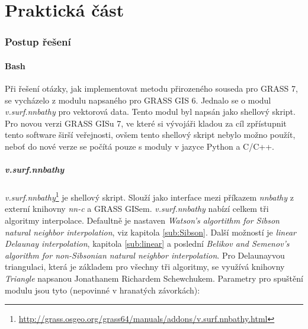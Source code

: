 \documentclass[12pt,a4paper]{article}
\begin{document}
\newpage	
\part{Praktická část}

\newpage
\section{Postup řešení}
\subsection{Bash}
\label{sub:Bash}

Při řešení otázky, jak implementovat metodu přirozeného souseda pro
GRASS 7, se vycházelo z modulu napsaného pro GRASS GIS 6. Jednalo se o
modul \emph{v.surf.nnbathy} pro vektorová data. Tento modul byl napsán
jako shellový skript. Pro novou verzi GRASS GISu 7, ve které si vývojáři kladou za
cíl zpřístupnit tento software širší veřejnosti, ovšem tento shellový skript nebylo možno použít, neboť do nové verze se počítá pouze s
moduly v jazyce Python a C/C++.

\subsubsection{v.surf.nnbathy}
\emph{v.surf.nnbathy}\footnote{\url{http://grass.osgeo.org/grass64/manuals/addons/v.surf.nnbathy.html}}
je shellový skript. Slouží jako interface mezi příkazem \emph{nnbathy} z
externí knihovny \emph{nn-c} a GRASS GISem. \emph{v.surf.nnbathy}
nabízí celkem tři algoritmy interpolace. Defaultně je nastaven
\emph{Watson's algortithm for Sibson natural neighbor
  interpolation}, viz kapitola \ref{sub:Sibson}. Další možností je \emph{linear Delaunay
  interpolation}, kapitola \ref{sub:linear} a poslední \emph{Belikov and Semenov's algorithm for
  non-Sibsonian natural neighbor interpolation}. Pro Delaunayvou
triangulaci, která je základem pro všechny tři algoritmy, se využívá
knihovny \emph{Triangle} napsanou Jonathanem Richardem
Schewchukem. Parametry pro spuštění modulu jsou tyto (nepovinné v
hranatých závorkách):
\end{document}
